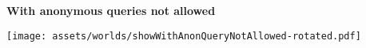 \textbf{With anonymous queries not allowed}\newline

\texttt{[image: assets/worlds/showWithAnonQueryNotAllowed-rotated.pdf]}